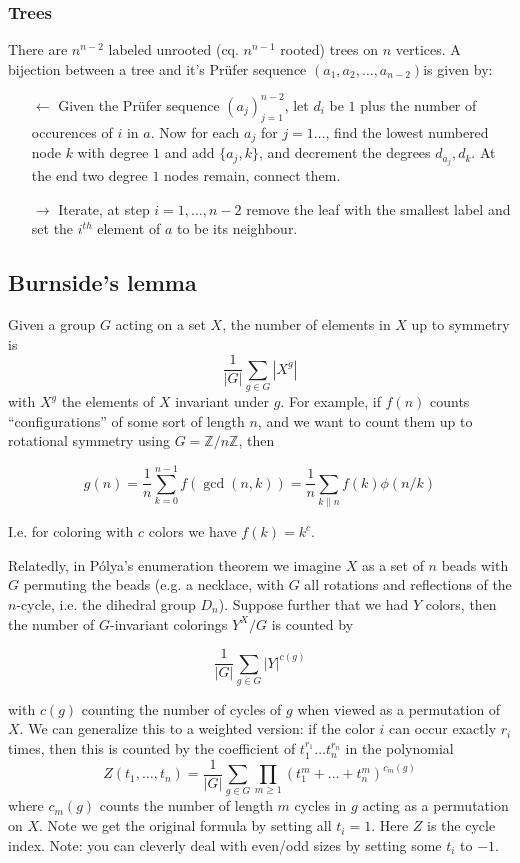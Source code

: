 \documentclass[
	a4paper,
	landscape,
	10pt,
	article
]{article}
\begin{document}
\subsubsection*{Trees}
There are $n^{n-2}$ labeled unrooted (cq. $n^{n-1}$ rooted) trees on $n$
vertices. A bijection between a tree and it's Pr\"ufer sequence
$(a_1, a_2, \dots, a_{n-2})$is given by:
\begin{enumerate}
	\item[$\leftarrow$] Given the Pr\"ufer sequence $(a_j)_{j=1}^{n-2}$,
		let $d_i$ be $1$ plus the
		number of occurences of $i$ in $a$. Now for each $a_j$ for $j=1\dots$,
		find the lowest
		numbered node $k$ with degree $1$ and add $\{a_j, k\}$, and decrement
		the degrees $d_{a_j}, d_k$. At the end two degree $1$ nodes remain,
		connect them.
	\item[$\rightarrow$] Iterate, at step $i=1,\dots,n-2$ remove the leaf with the
		smallest label and set the $i^{th}$ element of $a$ to be its
		neighbour. 
\end{enumerate}

\subsection{Burnside's lemma}
Given a group $G$ acting on a set $X$, the number of elements in $X$ up to
symmetry is $$\frac{1}{|G|}\sum_{g\in G} |X^g|$$ with $X^g$ the elements of
$X$ invariant under $g$. For example, if $f(n)$ counts ``configurations''
of some sort of length $n$, and we want to count them up to rotational symmetry
using $G = \mathbb{Z}/n\mathbb{Z}$, then

$$g(n) = \frac{1}{n} \sum_{k=0}^{n-1} f(\gcd(n, k))
	= \frac{1}{n}\sum_{k \| n} f(k) \phi(n / k)$$

I.e. for coloring with $c$ colors we have $f(k) = k^c$.

Relatedly, in P\'olya's enumeration theorem we imagine $X$ as a set of $n$
beads with $G$ permuting the beads (e.g. a necklace, with $G$ all rotations and
reflections of the $n$-cycle, i.e. the dihedral group $D_n$).
Suppose further that we had $Y$ colors, then
the number of $G$-invariant colorings $Y^X / G$ is counted by

$$\frac{1}{|G|}\sum_{g\in G} |Y|^{c(g)}$$

with $c(g)$ counting the number of cycles of $g$ when viewed as a permutation
of $X$. We can generalize this to a weighted version: if the color $i$ can
occur exactly $r_i$ times, then this is counted by the coefficient of
$t_1^{r_1}\dots t_n^{r_n}$ in the polynomial
$$Z(t_1,\dots,t_n) = \frac{1}{|G|}\sum_{g\in G} \prod_{m\geq 1}
	(t_1^m+\dots+t_n^m)^{c_m(g)}$$
where $c_m(g)$ counts the number of length $m$ cycles in $g$ acting as a
permutation on $X$. Note we get the original formula by setting all $t_i=1$.
Here $Z$ is the cycle index. Note: you can cleverly deal with even/odd sizes
by setting some $t_i$ to $-1$.
\end{document}
